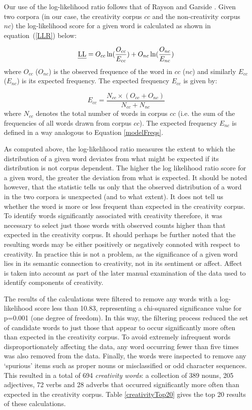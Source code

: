 \documentclass[10pt,letterpaper]{article}
\begin{document}
Our use of the log-likelihood ratio follows that of Rayson and Garside \cite{rayson00}.
Given two corpora (in our case, the creativity corpus $cc$ and the non-creativity corpus $nc$) the log-likelihood score for a given word is calculated as shown in equation~(\ref{LLR}) below:

\begin{equation}
\mbox{\em LL} =  O_{cc}\ln (\frac{O_{cc}}{E_{cc}} ) + O_{nc}\ln (\frac{O_{nc}}{E_{nc}} )
\label{LLR} 
\end{equation}
\noindent
where $O_{cc}$ ($O_{nc}$) is the observed frequence of the word in $cc$ ($nc$) and similarly $E_{cc}$ ($E_{nc}$) is its expected frequency. The expected frequency $E_{cc}$  is given by: 

\begin{equation}
E_{cc} = \frac{N_{cc} \times (O_{cc} + O_{nc})}{N_{cc} + N_{nc}}
\label{modelFreqs} 
\end{equation}
where $N_{cc}$ denotes the total number of words in corpus $cc$ (i.e. the sum of the frequencies of all words drawn from corpus $cc$). The expected frequency $E_{nc}$ is defined in a way analogous to Equation \ref{modelFreqs}.

As computed above, the log-likelihood ratio measures the extent to which the distribution of a given word deviates from what might be expected if its distribution is not corpus dependent. The higher the log likelihood ratio score for a given word, the greater the deviation from what is expected. It should be noted however, that the statistic tells us only that  the observed distribution of a word in the two corpora is unexpected (and to what extent).  It does not  tell us whether the word is more or less frequent than expected in the creativity corpus. To identify words significantly associated with creativity therefore, it was necessary to select just those words with observed counts higher than that expected in the creativity corpus. It should perhaps be further noted that the resulting words may be either positively or negatively connoted with respect to creativity. In practice this is not a problem, as the significance of a given word lies in its semantic connection to creativity, not in its sentiment or affect. Affect is taken into account as part of the later manual examination of the data used to identify components of creativity.


The results of the calculations were filtered to remove any words with a log-likelihood score less than 10.83, representing a chi-squared significance value for p=0.001 (one degree of freedom). In this way, the filtering process reduced the set of candidate words to just those that appear to occur significantly more often than expected in the creativity corpus. To avoid extremely infrequent words disproportionately affecting the data, any word occurring fewer than five times was also removed from the data. Finally, the words were inspected to remove any `spurious' items such as proper nouns or misclassified or odd character sequences. This resulted in a total of 694 {\em creativity words\/}: a collection of 389 nouns, 205 adjectives, 72 verbs and 28 adverbs that occurred significantly more often than expected in the creativity corpus. Table \ref{creativityTop20} gives the top 20 results of these calculations.
\end{document}
